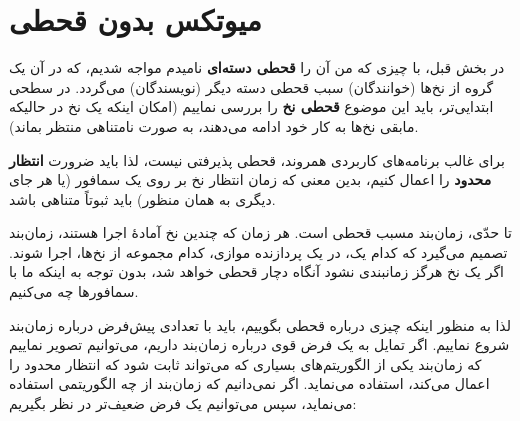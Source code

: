 \documentclass{book}
\begin{document}
\section{میوتکس بدون قحطی}
\label{props}

    در بخش قبل، با چیزی که من آن را \textbf{قحطی دسته‌ای} نامیدم مواجه شدیم، که در آن یک گروه از نخ‌ها (خوانندگان) 
    سبب قحطی دسته دیگر (نویسندگان) می‌گردد. در  سطحی ابتدایی‌تر،‌ باید این موضوع \textbf{قحطی نخ} را بررسی نماییم (امکان 
    اینکه یک نخ در حالیکه مابقی نخ‌ها به کار خود ادامه می‌دهند، به صورت نامتناهی منتظر بماند). 
    
    
    برای غالب برنامه‌های کاربردی همروند، قحطی پذیرفتی نیست، لذا باید ضرورت \textbf{انتظار محدود}
    را اعمال کنیم، بدین معنی که زمان انتظار نخ بر روی یک سمافور (یا هر جای دیگری به همان منظور) باید ثبوتاً متناهی باشد. 

    تا حدّی، زمان‌بند مسبب قحطی است. هر زمان که چندین نخ آمادهٔ اجرا هستند، زمان‌بند تصمیم می‌گیرد که کدام یک، در یک پردازنده موازی،‌ کدام 
    مجموعه از نخ‌ها، اجرا شوند. اگر یک نخ هرگز زمانبندی نشود آنگاه دچار قحطی خواهد شد، بدون توجه به اینکه ما با سمافورها چه می‌کنیم. 

    لذا به منظور اینکه چیزی درباره قحطی بگوییم،‌ باید با تعدادی پیش‌فرض درباره زمان‌بند شروع نماییم. 
    اگر تمایل به یک فرض قوی درباره زمان‌بند داریم، 
    می‌توانیم تصویر نماییم که زمان‌بند یکی از الگوریتم‌های بسیاری که می‌تواند ثابت شود که انتظار محدود را اعمال می‌کند، استفاده می‌نماید. 
    اگر نمی‌دانیم که زمان‌بند از چه الگوریتمی استفاده می‌نماید، سپس می‌توانیم یک فرض ضعیف‌تر در نظر بگیریم: 
\end{document}
